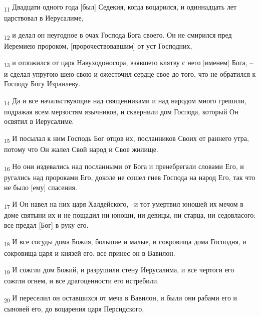 \begin{tcolorbox}
\textsubscript{11} Двадцати одного года [был] Седекия, когда воцарился, и одиннадцать лет царствовал в Иерусалиме,
\end{tcolorbox}
\begin{tcolorbox}
\textsubscript{12} и делал он неугодное в очах Господа Бога своего. Он не смирился пред Иеремиею пророком, [пророчествовавшим] от уст Господних,
\end{tcolorbox}
\begin{tcolorbox}
\textsubscript{13} и отложился от царя Навуходоносора, взявшего клятву с него [именем] Бога, --и сделал упругою шею свою и ожесточил сердце свое до того, что не обратился к Господу Богу Израилеву.
\end{tcolorbox}
\begin{tcolorbox}
\textsubscript{14} Да и все начальствующие над священниками и над народом много грешили, подражая всем мерзостям язычников, и сквернили дом Господа, который Он освятил в Иерусалиме.
\end{tcolorbox}
\begin{tcolorbox}
\textsubscript{15} И посылал к ним Господь Бог отцов их, посланников Своих от раннего утра, потому что Он жалел Свой народ и Свое жилище.
\end{tcolorbox}
\begin{tcolorbox}
\textsubscript{16} Но они издевались над посланными от Бога и пренебрегали словами Его, и ругались над пророками Его, доколе не сошел гнев Господа на народ Его, так что не было [ему] спасения.
\end{tcolorbox}
\begin{tcolorbox}
\textsubscript{17} И Он навел на них царя Халдейского, --и тот умертвил юношей их мечом в доме святыни их и не пощадил ни юноши, ни девицы, ни старца, ни седовласого: все предал [Бог] в руку его.
\end{tcolorbox}
\begin{tcolorbox}
\textsubscript{18} И все сосуды дома Божия, большие и малые, и сокровища дома Господня, и сокровища царя и князей его, все принес он в Вавилон.
\end{tcolorbox}
\begin{tcolorbox}
\textsubscript{19} И сожгли дом Божий, и разрушили стену Иерусалима, и все чертоги его сожгли огнем, и все драгоценности его истребили.
\end{tcolorbox}
\begin{tcolorbox}
\textsubscript{20} И переселил он оставшихся от меча в Вавилон, и были они рабами его и сыновей его, до воцарения царя Персидского,
\end{tcolorbox}
